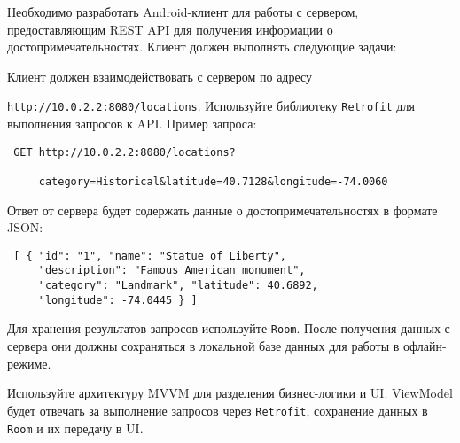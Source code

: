 
Необходимо разработать Android-клиент для работы с сервером, предоставляющим REST API для получения информации о достопримечательностях. Клиент должен выполнять следующие задачи:


Клиент должен взаимодействовать с сервером по адресу 

\texttt{http://10.0.2.2:8080/locations}. Используйте библиотеку \texttt{Retrofit} для выполнения запросов к API. Пример запроса:

\begin{verbatim} GET http://10.0.2.2:8080/locations?

     category=Historical&latitude=40.7128&longitude=-74.0060 \end{verbatim}

Ответ от сервера будет содержать данные о достопримечательностях в формате JSON:

\begin{verbatim} [ { "id": "1", "name": "Statue of Liberty", 
     "description": "Famous American monument",
     "category": "Landmark", "latitude": 40.6892, 
     "longitude": -74.0445 } ] \end{verbatim}


Для хранения результатов запросов используйте \texttt{Room}. После получения данных с сервера они должны сохраняться в локальной базе данных для работы в офлайн-режиме.


Используйте архитектуру MVVM для разделения бизнес-логики и UI. ViewModel будет отвечать за выполнение запросов через \texttt{Retrofit}, сохранение данных в \texttt{Room} и их передачу в UI.

